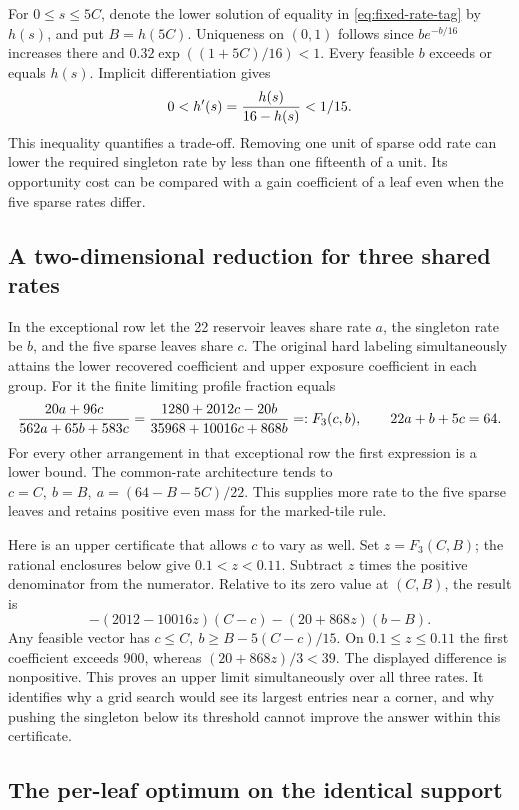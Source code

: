 For \(0\le s\le5C\), denote the lower solution of equality in
\eqref{eq:fixed-rate-tag} by \(h(s)\), and put \(B=h(5C)\). Uniqueness on \((0,1)\) follows since \(b e^{-b/16}\) increases there and \(0.32\exp((1+5C)/16)<1\). Every feasible \(b\) exceeds or equals \(h(s)\). Implicit differentiation gives
\[
 0<h'(s)={h(s)\over16-h(s)}<1/15.
\]
This inequality quantifies a trade-off. Removing one unit of sparse odd rate can lower the required singleton rate by less than one fifteenth of a unit. Its opportunity cost can be compared with a gain coefficient of a leaf even when the five sparse rates differ.

\subsection{A two-dimensional reduction for three shared rates}

In the exceptional row let the 22 reservoir leaves share rate \(a\), the singleton rate be \(b\), and the five sparse leaves share \(c\). The original hard labeling simultaneously attains the lower recovered coefficient and upper exposure coefficient in each group. For it the finite limiting profile fraction equals
\[
 {20a+96c\over562a+65b+583c}
 ={1280+2012c-20b\over35968+10016c+868b}
 =:F_3(c,b),
 \qquad 22a+b+5c=64.
\]
For every other arrangement in that exceptional row the first expression is a lower bound. The common-rate architecture tends to \(c=C,\ b=B,\ a=(64-B-5C)/22\). This supplies more rate to the five sparse leaves and retains positive even mass for the marked-tile rule.

Here is an upper certificate that allows \(c\) to vary as well. Set \(z=F_3(C,B)\); the rational enclosures below give \(0.1<z<0.11\). Subtract \(z\) times the positive denominator from the numerator. Relative to its zero value at \((C,B)\), the result is
\[
 -(2012-10016z)(C-c)-(20+868z)(b-B).
\]
Any feasible vector has \(c\le C,\ b\ge B-5(C-c)/15\). On \(0.1\le z\le0.11\) the first coefficient exceeds 900, whereas \((20+868z)/3<39\). The displayed difference is nonpositive. This proves an upper limit simultaneously over all three rates. It identifies why a grid search would see its largest entries near a corner, and why pushing the singleton below its threshold cannot improve the answer within this certificate.

\subsection{The per-leaf optimum on the identical support}

